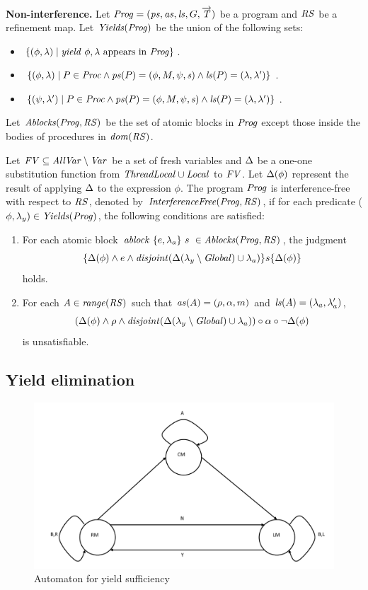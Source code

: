 {\bf Non-interference.}
Let $\mathit{Prog} = (\mathit{ps}, \mathit{as}, \mathit{ls}, G, \overrightarrow{\mathit{T}})$ be a program
and $\mathit{RS}$ be a refinement map.
Let $\mathit{Yields}(\mathit{Prog})$ be the union of the following sets:
\begin{itemize}
\item
$\{(\phi,\lambda) \mid \mathit{yield}\ \phi,\lambda~\mathrm{appears~in~\mathit{Prog}}\}$.
\item
$\{(\phi,\lambda) \mid P \in \mathit{Proc} \wedge \mathit{ps}(P) = (\phi, M, \psi, \mathit{s}) \wedge \mathit{ls}(P) = (\lambda,\lambda')\}$.
\item
$\{(\psi,\lambda') \mid P \in \mathit{Proc} \wedge \mathit{ps}(P) = (\phi, M, \psi, \mathit{s}) \wedge \mathit{ls}(P) = (\lambda,\lambda')\}$.
\end{itemize}
Let $\mathit{Ablocks}(\mathit{Prog},\mathit{RS})$ be the set of atomic blocks in $\mathit{Prog}$ except those inside the bodies of procedures
in $\mathit{dom}(\mathit{RS})$.

Let $\mathit{FV} \subseteq \mathit{AllVar} \setminus \mathit{Var}$ be a set of fresh variables and $\Delta$ be a one-one 
substitution function from $\mathit{ThreadLocal} \cup \mathit{Local}$ to $\mathit{FV}$.
Let $\Delta(\phi)$ represent the result of applying $\Delta$ to the expression $\phi$.
The program $\mathit{Prog}$ is interference-free with respect to $\mathit{RS}$, denoted by $\mathit{InterferenceFree}(\mathit{Prog},\mathit{RS})$,
if for each predicate ($\phi,\lambda_y) \in \mathit{Yields}(\mathit{Prog})$, the following conditions are satisfied:
\begin{enumerate}
\item
For each atomic block $\mathit{ablock}\ {\{e,\lambda_a\}}\ {s}\  \in \mathit{Ablocks}(\mathit{Prog},\mathit{RS})$, the judgment
\[
\{\Delta(\phi) \wedge e \wedge \mathit{disjoint}(\Delta(\lambda_y \setminus \mathit{Global}) \cup \lambda_a)\} s \{\Delta(\phi)\}
\]
holds.
\item
For each $A \in \mathit{range}(\mathit{RS})$ such that $\mathit{as}(A) = (\rho, \alpha, m)$ and $\mathit{ls}(A) = (\lambda_a,\lambda'_a)$, 
\[
(\Delta(\phi) \wedge \rho \wedge \mathit{disjoint}(\Delta(\lambda_y \setminus \mathit{Global}) \cup \lambda_a)) \circ \alpha \circ \neg\Delta(\phi)
\]
is unsatisfiable.
\end{enumerate}

\subsection{Yield elimination}
\label{sec:yield-elimination}

\begin{figure}
\includegraphics[scale=0.35]{YieldTypeCheckingAutomaton.pdf}
\caption{Automaton for yield sufficiency}
\label{fig:YieldTypeCheckingAutomaton}
\end{figure}

